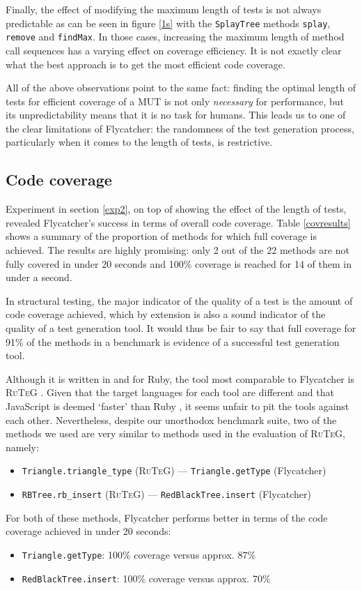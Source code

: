 Finally, the effect of modifying the maximum length of tests is not always predictable as can be seen in figure \ref{1s} with the \texttt{SplayTree} methods \texttt{splay}, \texttt{remove} and \texttt{findMax}. In those cases, increasing the maximum length of method call sequences has a varying effect on coverage efficiency. It is not exactly clear what the best approach is to get the most efficient code coverage.

All of the above observations point to the same fact: finding the optimal length of tests for efficient coverage of a MUT is not only \emph{necessary} for performance, but its unpredictability means that it is no task for humans. This leads us to one of the clear limitations of \textsf{Flycatcher}: the randomness of the test generation process, particularly when it comes to the length of tests, is restrictive.

\subsection{Code coverage}
Experiment in section \ref{exp2}, on top of showing the effect of the length of tests, revealed \textsf{Flycatcher}'s success in terms of overall code coverage. Table \ref{covresults} shows a summary of the proportion of methods for which full coverage is achieved. The results are highly promising: only 2 out of the 22 methods are not fully covered in under 20 seconds and 100\% coverage is reached for 14 of them in under a second.

In structural testing, the major indicator of the quality of a test is the amount of code coverage achieved, which by extension is also a sound indicator of the quality of a test generation tool. It would thus be fair to say that full coverage for 91\% of the methods in a benchmark is evidence of a successful test generation tool.

Although it is written in and for Ruby, the tool most comparable to \textsf{Flycatcher} is \textsc{RuTeG} \cite{mairhofer2008search}. Given that the target languages for each tool are different and that JavaScript is deemed `faster' than Ruby \cite{faster}, it seems unfair to pit the tools against each other. Nevertheless, despite our unorthodox benchmark suite, two of the methods we used are very similar to methods used in the evaluation of \textsc{RuTeG}, namely: 
\begin{itemize}
   \item \texttt{Triangle.triangle\_type} (\textsc{RuTeG}) --- \texttt{Triangle.getType} (\textsf{Flycatcher})
   \item \texttt{RBTree.rb\_insert} (\textsc{RuTeG}) --- \texttt{RedBlackTree.insert} (\textsf{Flycatcher})
\end{itemize}
For both of these methods, Flycatcher performs better in terms of the code coverage achieved in under 20 seconds:
\begin{itemize}
   \item \texttt{Triangle.getType}: 100\% coverage versus approx. 87\%
   \item \texttt{RedBlackTree.insert}: 100\% coverage versus approx. 70\%
\end{itemize}

